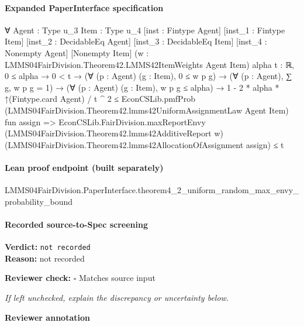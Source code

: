 \documentclass[10pt]{article}
\newcommand{\reviewerbox}{%
  \par\noindent\fbox{\parbox{0.96\linewidth}{\rule{0pt}{0.38in}}}\par
}
\newcommand{\reviewmatch}[1]{%
  \par\noindent\textbf{Reviewer check:} $\square$\; #1\par
  \noindent\emph{If left unchecked, explain the discrepancy or uncertainty below.}\par
}
\begin{document}
\paragraph{Expanded PaperInterface specification}
\begin{ReviewVerbatim}
∀ {Agent : Type u_3} {Item : Type u_4} [inst : Fintype Agent] [inst_1 : Fintype Item] [inst_2 : DecidableEq Agent]
  [inst_3 : DecidableEq Item] [inst_4 : Nonempty Agent] [Nonempty Item]
  (w : LMMS04FairDivision.Theorem42.LMMS42ItemWeights Agent Item) {alpha t : ℝ},
  0 ≤ alpha →
    0 < t →
      (∀ (p : Agent) (g : Item), 0 ≤ w p g) →
        (∀ (p : Agent), ∑ g, w p g = 1) →
          (∀ (p : Agent) (g : Item), w p g ≤ alpha) →
            1 - 2 * alpha * ↑(Fintype.card Agent) / t ^ 2 ≤
              EconCSLib.pmfProb (LMMS04FairDivision.Theorem42.lmms42UniformAssignmentLaw Agent Item) fun assign =>
                EconCSLib.FairDivision.maxReportEnvy (LMMS04FairDivision.Theorem42.lmms42AdditiveReport w)
                    (LMMS04FairDivision.Theorem42.lmms42AllocationOfAssignment assign) ≤
                  t
\end{ReviewVerbatim}

\paragraph{Lean proof endpoint (built separately)}\begin{ReviewVerbatim}
LMMS04FairDivision.PaperInterface.theorem4_2_uniform_random_max_envy_probability_bound
\end{ReviewVerbatim}

\paragraph{Recorded source-to-Spec screening}
\textbf{Verdict:} \texttt{not recorded}
\\
\textbf{Reason:} not recorded
\reviewmatch{Matches source input}
\noindent\textbf{Reviewer annotation}\par
\reviewerbox
\end{document}

